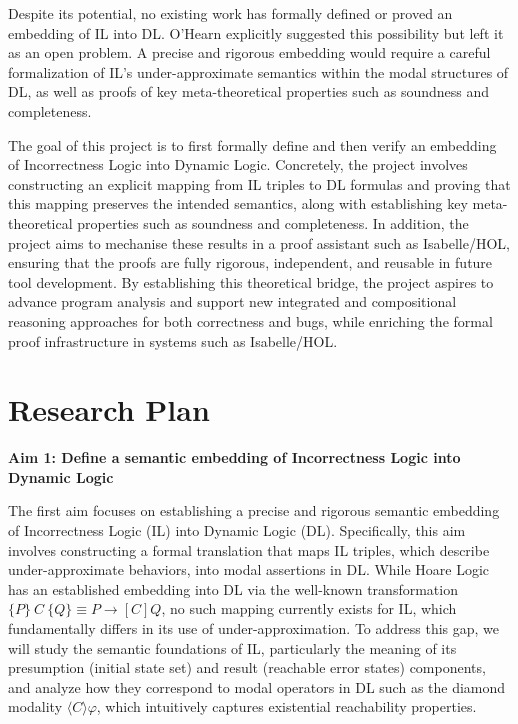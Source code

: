 Despite its potential, no existing work has formally defined or proved an embedding of IL into DL. O’Hearn \cite{ohearnincorrectness2020} explicitly suggested this possibility but left it as an open problem. A precise and rigorous embedding would require a careful formalization of IL’s under-approximate semantics within the modal structures of DL, as well as proofs of key meta-theoretical properties such as soundness and completeness.

The goal of this project is to first formally define and then verify an embedding of Incorrectness Logic into Dynamic Logic. Concretely, the project involves constructing an explicit mapping from IL triples to DL formulas and proving that this mapping preserves the intended semantics, along with establishing key meta-theoretical properties such as soundness and completeness. In addition, the project aims to mechanise these results in a proof assistant such as Isabelle/HOL, ensuring that the proofs are fully rigorous, independent, and reusable in future tool development. By establishing this theoretical bridge, the project aspires to advance program analysis and support new integrated and compositional reasoning approaches for both correctness and bugs, while enriching the formal proof infrastructure in systems such as Isabelle/HOL.


\section*{Research Plan}
\textbf{Aim 1: Define a semantic embedding of Incorrectness Logic into Dynamic Logic}

The first aim focuses on establishing a precise and rigorous semantic embedding of Incorrectness Logic (IL) into Dynamic Logic (DL). Specifically, this aim involves constructing a formal translation that maps IL triples, which describe under-approximate behaviors, into modal assertions in DL. While Hoare Logic has an established embedding into DL via the well-known transformation $\{P\}~C~\{Q\} \equiv P \rightarrow [C]Q$, no such mapping currently exists for IL, which fundamentally differs in its use of under-approximation. To address this gap, we will study the semantic foundations of IL, particularly the meaning of its presumption (initial state set) and result (reachable error states) components, and analyze how they correspond to modal operators in DL such as the diamond modality $\langle C \rangle \varphi$, which intuitively captures existential reachability properties.

